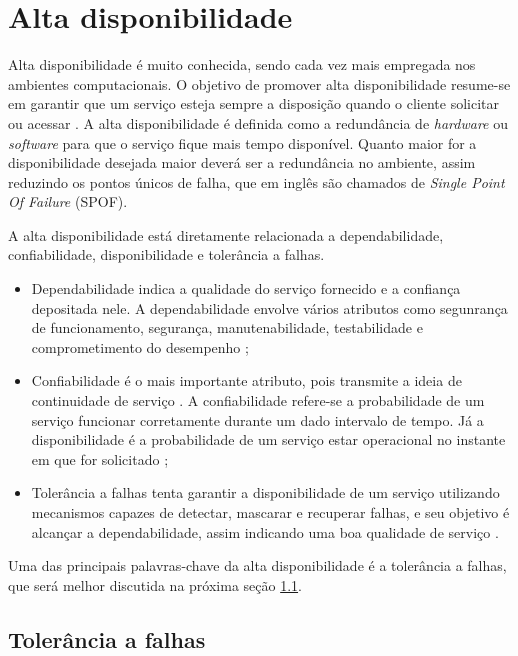 \chapter{Alta disponibilidade}
\label{cap:altadiponibilidade}

Alta disponibilidade é muito conhecida, sendo cada vez mais empregada nos ambientes computacionais. O objetivo de promover alta disponibilidade 
resume-se em garantir que um serviço esteja sempre a disposição quando o cliente solicitar ou acessar \cite{costa2009}.
A alta disponibilidade é definida como a redundância de \textit{hardware} ou \textit{software} para que o serviço fique mais tempo disponível.
Quanto maior for a disponibilidade desejada maior deverá ser a redundância no ambiente, assim reduzindo os pontos únicos de falha,
que em inglês são chamados de \textit{Single Point Of Failure} (SPOF).

A alta disponibilidade está diretamente relacionada a dependabilidade, confiabilidade, disponibilidade e tolerância a falhas. 
\begin{itemize}
 \item Dependabilidade indica a qualidade do serviço fornecido e a confiança depositada nele. A dependabilidade envolve vários
atributos como segunrança de funcionamento, segurança, manutenabilidade, testabilidade e comprometimento do desempenho \cite{weber2002};
 \item Confiabilidade é o mais importante atributo, pois transmite a ideia de continuidade de serviço \cite{pankaj1994}. A confiabilidade refere-se 
a probabilidade de um serviço funcionar corretamente durante um dado intervalo de tempo. Já a disponibilidade é a probabilidade de um 
serviço estar operacional no instante em que for solicitado \cite{costa2009};
  \item Tolerância a falhas tenta garantir a disponibilidade de um serviço utilizando mecanismos capazes de detectar, mascarar e recuperar falhas, 
e seu objetivo é alcançar a dependabilidade, assim indicando uma boa qualidade de serviço \cite{costa2009}.
\end{itemize}

Uma das principais palavras-chave da alta disponibilidade é a tolerância a falhas, que será melhor discutida na próxima seção \ref{section:toleranciafalhas}.

\section{Tolerância a falhas}
\label{section:toleranciafalhas}

